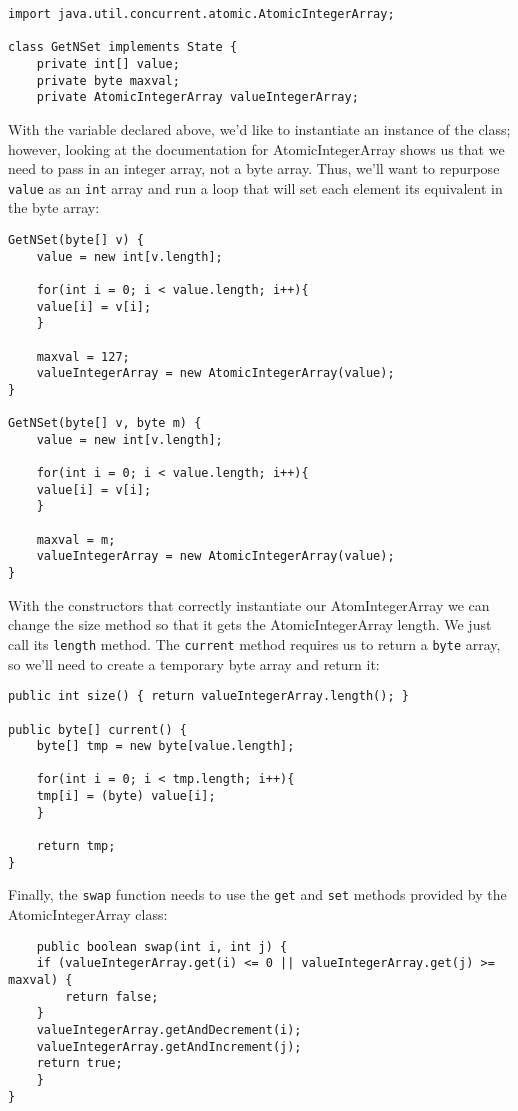\documentclass[11pt]{article}
\begin{document}
\begin{verbatim}
import java.util.concurrent.atomic.AtomicIntegerArray;

class GetNSet implements State {
    private int[] value;
    private byte maxval;
    private AtomicIntegerArray valueIntegerArray;
\end{verbatim}

With the variable declared above, we'd like to instantiate
an instance of the class; however, looking at the documentation
for AtomicIntegerArray shows us that we need to pass in an
integer array, not a byte array. Thus, we'll want to repurpose
\verb~value~ as an \verb~int~ array and run a loop that will set each
element its equivalent in the byte array:

\begin{verbatim}
GetNSet(byte[] v) {
    value = new int[v.length];

    for(int i = 0; i < value.length; i++){
	value[i] = v[i];
    }

    maxval = 127;
    valueIntegerArray = new AtomicIntegerArray(value);
}

GetNSet(byte[] v, byte m) { 
    value = new int[v.length];

    for(int i = 0; i < value.length; i++){
	value[i] = v[i];
    }

    maxval = m;
    valueIntegerArray = new AtomicIntegerArray(value);
}
\end{verbatim}

With the constructors that correctly instantiate our AtomIntegerArray
we can change the size method so that it gets the AtomicIntegerArray
length. We just call its \verb~length~ method. The \verb~current~ method requires
us to return a \verb~byte~ array, so we'll need to create a temporary
byte array and return it:

\begin{verbatim}
public int size() { return valueIntegerArray.length(); }

public byte[] current() {
    byte[] tmp = new byte[value.length];

    for(int i = 0; i < tmp.length; i++){
	tmp[i] = (byte) value[i];
    }

    return tmp;
}
\end{verbatim}

Finally, the \verb~swap~ function needs to use the \verb~get~ and \verb~set~ methods
provided by the AtomicIntegerArray class:

\begin{verbatim}
    public boolean swap(int i, int j) {
	if (valueIntegerArray.get(i) <= 0 || valueIntegerArray.get(j) >= maxval) {
	    return false;
	}
	valueIntegerArray.getAndDecrement(i);
	valueIntegerArray.getAndIncrement(j);
	return true;
    }
}
\end{verbatim}
\end{document}
